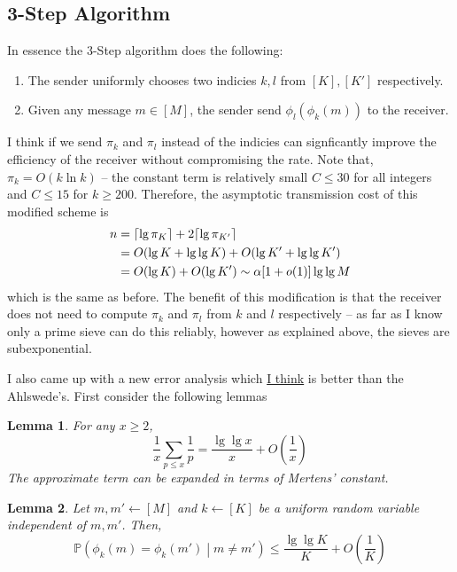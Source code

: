 \documentclass{article}
\DeclarePairedDelimiter{\ceilp}{\lceil}{\rceil}
\newcommand{\ceil}[1]{\ceilp{#1}}
\newtheorem{lemma}{Lemma}
\begin{document}
\subsection{3-Step Algorithm}
In essence the 3-Step algorithm does the following:
\begin{enumerate}
	\item The sender uniformly chooses two indicies \(k,l\) from \([K],[K']\) respectively.
	\item Given any message \(m \in [M]\), the sender send \(\phi_l(\phi_k(m))\) to the receiver. 
\end{enumerate} 
I think if we send \(\pi_k\) and \(\pi_l\) instead of the indicies can signficantly improve the efficiency of the receiver without compromising the rate. Note that, \(\pi_k = O(k \ln k)\) -- the constant term is relatively small \(C \leq 30\) for all integers and \(C \leq 15\) for \(k \geq 200\). Therefore, the asymptotic transmission cost of this modified scheme is 
\begin{align}
	n &= \ceil{\lg \pi_K} + 2\ceil{\lg \pi_{K'}} \\
	&= O(\lg K + \lg\lg K) + O(\lg K' + \lg \lg K') \\
	&= O(\lg K) + O(\lg K') \sim \alpha [1 + o(1)] \lg \lg M
\end{align}
which is the same as before. The benefit of this modification is that the receiver does not need to compute \(\pi_k\) and \(\pi_l\) from \(k\) and \(l\) respectively -- as far as I know only a prime sieve can do this reliably, however as explained above, the sieves are subexponential. 

I also came up with a new error analysis which \underline{I think} is better than the Ahlswede's. First consider the following lemmas
\begin{lemma}
	For any \(x \geq 2\),
	\begin{equation}
		\frac{1}{x}\sum_{p \leq x} \frac{1}{p} = \dfrac{\lg \lg x}{x} + O(\frac{1}{x})
	\end{equation}
	The approximate term can be expanded in terms of Mertens' constant.
\end{lemma}

\begin{lemma}
	Let \(m,m' \gets [M]\) and \(k \gets [K]\) be a uniform random variable independent of \(m,m'\). Then,
	\begin{equation*}
		\mathbb{P}\left( \phi_k(m) = \phi_k(m')  \middle| m \neq m'  \right) \leq \dfrac{\lg \lg K}{K} + O(\frac{1}{K})
	\end{equation*}
\end{lemma}
\end{document}
